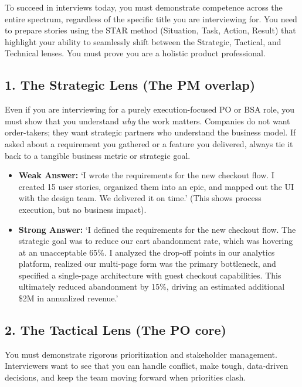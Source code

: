 \documentclass[
  11pt,
  openany,
  oneside]{book}
\providecommand{\tightlist}{%
  \setlength{\itemsep}{0pt}\setlength{\parskip}{0pt}}
\begin{document}
To succeed in interviews today, you must demonstrate competence across
the entire spectrum, regardless of the specific title you are
interviewing for. You need to prepare stories using the STAR method
(Situation, Task, Action, Result) that highlight your ability to
seamlessly shift between the Strategic, Tactical, and Technical lenses.
You must prove you are a holistic product professional.

\subsection{1. The Strategic Lens (The PM
overlap)}\label{the-strategic-lens-the-pm-overlap}

Even if you are interviewing for a purely execution-focused PO or BSA
role, you must show that you understand \emph{why} the work matters.
Companies do not want order-takers; they want strategic partners who
understand the business model. If asked about a requirement you gathered
or a feature you delivered, always tie it back to a tangible business
metric or strategic goal.

\begin{itemize}
\tightlist
\item
  \textbf{Weak Answer:} `I wrote the requirements for the new checkout
  flow. I created 15 user stories, organized them into an epic, and
  mapped out the UI with the design team. We delivered it on time.'
  (This shows process execution, but no business impact).
\item
  \textbf{Strong Answer:} `I defined the requirements for the new
  checkout flow. The strategic goal was to reduce our cart abandonment
  rate, which was hovering at an unacceptable 65\%. I analyzed the
  drop-off points in our analytics platform, realized our multi-page
  form was the primary bottleneck, and specified a single-page
  architecture with guest checkout capabilities. This ultimately reduced
  abandonment by 15\%, driving an estimated additional \$2M in
  annualized revenue.'
\end{itemize}

\subsection{2. The Tactical Lens (The PO
core)}\label{the-tactical-lens-the-po-core}

You must demonstrate rigorous prioritization and stakeholder management.
Interviewers want to see that you can handle conflict, make tough,
data-driven decisions, and keep the team moving forward when priorities
clash.
\end{document}
